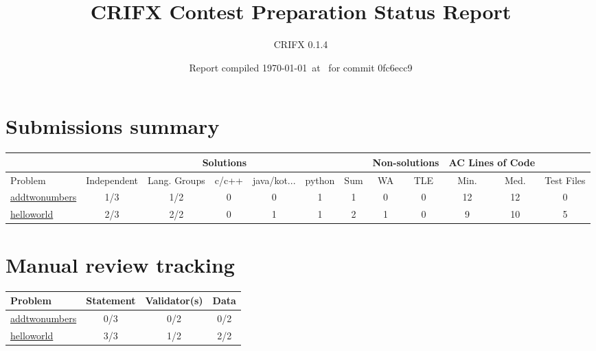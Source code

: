 \documentclass{article}%
\title{CRIFX Contest Preparation Status Report}%
\author{CRIFX 0.1.4}%
\date{Report compiled \today~at \DTMcurrenttime\DTMcurrentzone~for commit 0fc6ecc9}%
\begin{document}
%
\normalsize%
\maketitle%
\section*{Submissions summary}%
\label{sec:Submissionssummary}%
\begin{tabular}{|l|c|c|c|c|c|c|c|c|c|c|c|}%
\hline%
\rowcolor{cyan}%
&\multicolumn{6}{c|}{{\tiny Solutions}}&\multicolumn{2}{c|}{{\tiny Non-solutions}}&\multicolumn{2}{c|}{{\tiny AC Lines of Code}}&\\%
\hline%
\rowcolor{cyan}%
{\tiny Problem}&{\tiny Independent}&{\tiny Lang. Groups}&{\tiny c/c++}&{\tiny java/kot...}&{\tiny python}&{\tiny Sum}&{\tiny WA}&{\tiny TLE}&{\tiny Min.}&{\tiny Med.}&{\tiny Test Files}\\%
\hline%
\hyperref[sec:addtwonumbers]{addtwonumbers}&\cellcolor{insufficientred}1/3&\cellcolor{insufficientred}1/2&0&0&1&1&0&0&12&12&0\\%
\hline%
\hyperref[sec:helloworld]{helloworld}&\cellcolor{insufficientred}2/3&\cellcolor{sufficientgreen}2/2&0&1&1&2&1&0&9&10&5\\%
\hline%
\end{tabular}

%
\section*{Manual review tracking}%
\label{sec:Manualreviewtracking}%
\begin{tabular}{|l|c|c|c|}%
\hline%
\rowcolor{cyan}%
{\tiny Problem}&{\tiny Statement}&{\tiny Validator(s)}&{\tiny Data}\\%
\hline%
\hyperref[sec:addtwonumbers]{addtwonumbers}&\cellcolor{insufficientred}0/3&\cellcolor{insufficientred}0/2&\cellcolor{insufficientred}0/2\\%
\hline%
\hyperref[sec:helloworld]{helloworld}&\cellcolor{sufficientgreen}3/3&\cellcolor{insufficientred}1/2&\cellcolor{sufficientgreen}2/2\\%
\hline%
\end{tabular}

%
\end{document}
